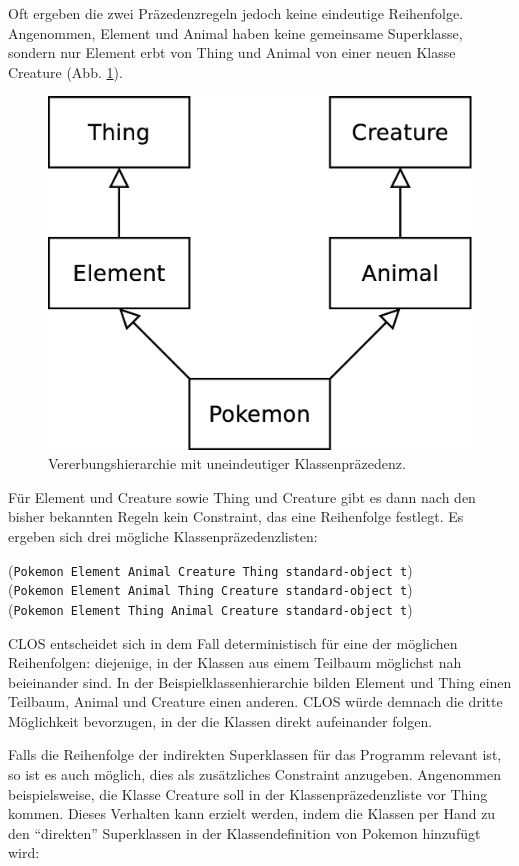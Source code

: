 Oft ergeben die zwei Präzedenzregeln jedoch keine eindeutige Reihenfolge. Angenommen, Element und Animal haben keine gemeinsame Superklasse, sondern nur Element erbt von Thing und Animal von einer neuen Klasse Creature (Abb. \ref{creature}). 

\begin{figure}[h]
 \centering
 \includegraphics[scale=0.3]{pictures/creature}
 \caption{Vererbungshierarchie mit uneindeutiger Klassenpräzedenz.}
 \label{creature}
\end{figure}

Für Element und Creature sowie Thing und Creature gibt es dann nach den bisher bekannten Regeln kein Constraint, das eine Reihenfolge festlegt. Es ergeben sich drei mögliche Klassenpräzedenzlisten:

(\texttt{Pokemon Element Animal Creature Thing standard-object t})\\
(\texttt{Pokemon Element Animal Thing Creature standard-object t})\\ 
(\texttt{Pokemon Element Thing Animal Creature standard-object t})

CLOS entscheidet sich in dem Fall deterministisch für eine der möglichen Reihenfolgen: diejenige, in der Klassen aus einem Teilbaum möglichst nah beieinander sind. In der Beispielklassenhierarchie bilden Element und Thing einen Teilbaum, Animal und Creature einen anderen. CLOS würde demnach die dritte Möglichkeit bevorzugen, in der die Klassen direkt aufeinander folgen.

Falls die Reihenfolge der indirekten Superklassen für das Programm relevant ist, so ist es auch möglich, dies als zusätzliches Constraint anzugeben. Angenommen beispielsweise, die Klasse Creature soll in der Klassenpräzedenzliste vor Thing kommen. Dieses Verhalten kann erzielt werden, indem die Klassen per Hand zu den ``direkten'' Superklassen in der Klassendefinition von Pokemon hinzufügt wird:

